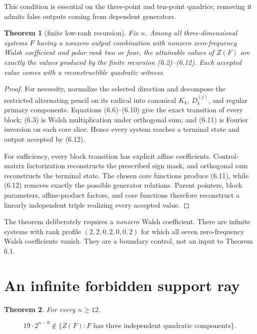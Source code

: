\documentclass[11pt]{article}
\newtheorem{theorem}{Theorem}[section]
\theoremstyle{remark}
\numberwithin{equation}{section}
\begin{document}
This condition is essential on the three-point and ten-point quadrics; removing
it admits false outputs coming from dependent generators.

\Needspace{0.23\textheight}
\begin{theorem}[finite low-rank recursion]
Fix \(n\). Among all
three-dimensional systems \(F\) having a nonzero output combination with
nonzero zero-frequency Walsh coefficient and polar rank two or four, the
attainable values of \(Z(F)\) are exactly the values produced by the finite
recursion (6.2)--(6.12). Each accepted value comes with a reconstructible
quadratic witness.
\end{theorem}


\begin{proof}
For necessity, normalize the selected direction and decompose the
restricted alternating pencil on its radical into canonical \(K_k\),
\(D_k^{(j)}\), and regular primary components. Equations (6.6)--(6.10) give the
exact transition of every block; (6.3) is Walsh multiplication under orthogonal
sum; and (6.11) is Fourier inversion on each core slice. Hence every system
reaches a terminal state and output accepted by (6.12).

For sufficiency, every block transition has explicit affine coefficients.
Control-matrix factorization reconstructs the prescribed sign mask, and
orthogonal sum reconstructs the terminal state. The chosen core functions
produce (6.11), while (6.12) removes exactly the possible generator relations.
Parent pointers, block parameters, affine-product factors, and core functions
therefore reconstruct a linearly independent triple realizing every accepted
value.
\end{proof}


The theorem deliberately requires a \emph{nonzero} Walsh coefficient. There are
infinite systems with rank profile \((2,2,0,2,0,0,2)\) for which all seven
zero-frequency Walsh coefficients vanish. They are a boundary control, not an
input to Theorem 6.1.

\section{An infinite forbidden support ray}


\Needspace{0.23\textheight}
\begin{theorem}
For every \(n\ge12\),
\end{theorem}


\[
19\cdot2^{n-9}\notin\{Z(F):F\text{ has three independent quadratic components}\}.
\]
\end{document}

